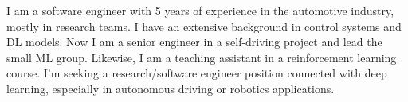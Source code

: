 I am a software engineer with 5 years of experience in the automotive industry,
mostly in research teams. I have an extensive background in control
systems and DL models. Now I am a senior engineer in a self-driving project and lead the small ML group. Likewise, I am a teaching assistant
in a reinforcement learning course. I'm seeking a research/software engineer
position connected with deep learning, especially in autonomous driving or
robotics applications.